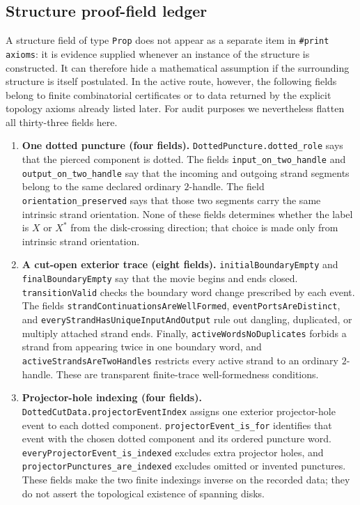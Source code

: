 \subsection{Structure proof-field ledger}
\label{app:lean-proof-fields}

A structure field of type \texttt{Prop} does not appear as a separate item in
\texttt{\#print axioms}: it is evidence supplied whenever an instance of the
structure is constructed.  It can therefore hide a mathematical assumption if
the surrounding structure is itself postulated.  In the active route, however,
the following fields belong to finite combinatorial certificates or to data
returned by the explicit topology axioms already listed later.  For audit
purposes we nevertheless flatten all thirty-three fields here.

\begin{enumerate}[label=\textbf{F\arabic*.},leftmargin=*]

\item \textbf{One dotted puncture (four fields).}
\nolinkurl{DottedPuncture.dotted_role} says that the pierced component is
dotted.  The fields \nolinkurl{input_on_two_handle} and
\nolinkurl{output_on_two_handle} say that the incoming and outgoing strand
segments belong to the same declared ordinary $2$-handle.  The field
\nolinkurl{orientation_preserved} says that those two segments carry the same
intrinsic strand orientation.  None of these fields determines whether the
label is $X$ or $X^*$ from the disk-crossing direction; that choice is made
only from intrinsic strand orientation.

\item \textbf{A cut-open exterior trace (eight fields).}
\nolinkurl{initialBoundaryEmpty} and \nolinkurl{finalBoundaryEmpty} say that the
movie begins and ends closed.  \nolinkurl{transitionValid} checks the boundary
word change prescribed by each event.  The fields
\nolinkurl{strandContinuationsAreWellFormed},
\nolinkurl{eventPortsAreDistinct}, and
\nolinkurl{everyStrandHasUniqueInputAndOutput} rule out dangling, duplicated, or
multiply attached strand ends.  Finally,
\nolinkurl{activeWordsNoDuplicates} forbids a strand from appearing twice in one
boundary word, and \texttt{activeStrandsAreTwoHandles} restricts every active
strand to an ordinary $2$-handle.  These are transparent finite-trace
well-formedness conditions.

\item \textbf{Projector-hole indexing (four fields).}
\nolinkurl{DottedCutData.projectorEventIndex} assigns one exterior projector-hole
event to each dotted component.  \nolinkurl{projectorEvent_is_for} identifies
that event with the chosen dotted component and its ordered puncture word.
\nolinkurl{everyProjectorEvent_is_indexed} excludes extra projector holes, and
\nolinkurl{projectorPunctures_are_indexed} excludes omitted or invented
punctures.  These fields make the two finite indexings inverse on the recorded
data; they do not assert the topological existence of spanning disks.


\end{enumerate}
